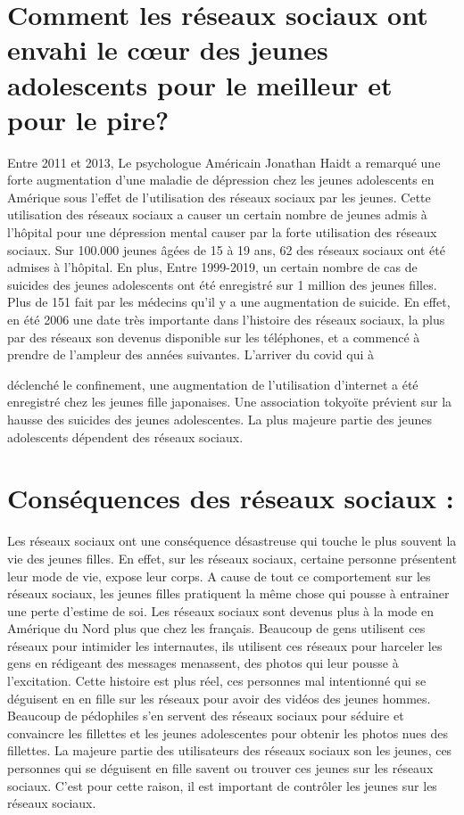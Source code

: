 \documentclass[12pt,a4paper,titlepage]{article}
\begin{document}
\section{Comment les réseaux sociaux ont envahi le cœur des jeunes
adolescents pour le meilleur et pour le pire?}
Entre 2011 et 2013, Le psychologue Américain Jonathan
Haidt a remarqué une forte augmentation d’une maladie de
dépression chez les jeunes adolescents en Amérique sous
l’effet de l’utilisation des réseaux sociaux par les jeunes. Cette
utilisation des réseaux sociaux a causer un certain nombre de
jeunes admis à l’hôpital pour une dépression mental causer
par la forte utilisation des réseaux sociaux. Sur 100.000
jeunes âgées de 15 à 19 ans, 62%
des réseaux sociaux ont été admises à l’hôpital. En plus, Entre
1999-2019, un certain nombre de cas de suicides des jeunes
adolescents ont été enregistré sur 1 million des jeunes filles.
Plus de 151%
fait par les médecins qu’il y a une augmentation de suicide.
En effet, en été 2006 une date très importante dans l’histoire
des réseaux sociaux, la plus par des réseaux son devenus
disponible sur les téléphones, et a commencé à prendre de
l’ampleur des années suivantes. L’arriver du covid qui à

déclenché le confinement, une augmentation de l’utilisation
d’internet a été enregistré chez les jeunes fille japonaises.
Une association tokyoïte prévient sur la hausse des suicides
des jeunes adolescentes. La plus majeure partie des jeunes
adolescents dépendent des réseaux sociaux. 

\section{Conséquences des réseaux sociaux :}
Les réseaux sociaux ont une conséquence désastreuse qui
touche le plus souvent la vie des jeunes filles.
En effet, sur les réseaux sociaux, certaine personne
présentent leur mode de vie, expose leur corps. A cause de
tout ce comportement sur les réseaux sociaux, les jeunes
filles pratiquent la même chose qui pousse à entrainer une
perte d’estime de soi.
Les réseaux sociaux sont devenus plus à la mode en Amérique
du Nord plus que chez les français. Beaucoup de gens
utilisent ces réseaux pour intimider les internautes, ils
utilisent ces réseaux pour harceler les gens en rédigeant des
messages menassent, des photos qui leur pousse à
l’excitation. Cette histoire est plus réel, ces personnes mal
intentionné qui se déguisent en en fille sur les réseaux pour
avoir des vidéos des jeunes hommes. Beaucoup de
pédophiles s’en servent des réseaux sociaux pour séduire et
convaincre les fillettes et les jeunes adolescentes pour
obtenir les photos nues des fillettes. La majeure partie des
utilisateurs des réseaux sociaux son les jeunes, ces personnes
qui se déguisent en fille savent ou trouver ces jeunes sur les
réseaux sociaux. C’est pour cette raison, il est important de
contrôler les jeunes sur les réseaux sociaux.
\end{document}
